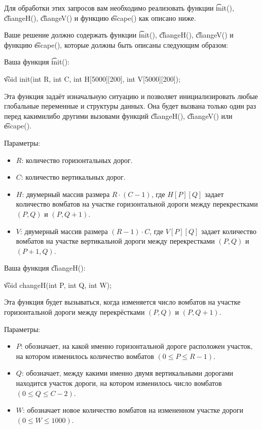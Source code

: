Для обработки этих запросов вам необходимо реализовать функции \t{init()}, \t{changeH()}, \t{changeV()} и функцию \t{escape()} как описано ниже.

Ваше решение должно содержать функции \t{init()}, \t{changeH()}, \t{changeV()} и функцию \t{escape()}, которые должны быть описаны следующим образом:

Ваша функция \t{init()}:

\t{void init(int R, int C, int H[5000][200], int V[5000][200]);}

Эта функция задаёт изначальную ситуацию и позволяет инициализировать любые глобальные переменные и структуры данных. Она будет вызвана только один раз перед какими­либо другими вызовами функций \t{changeH()}, \t{changeV()} или \t{escape()}.

Параметры:
\begin{itemize}
\item $R$: количество горизонтальных дорог.
\item $C$: количество вертикальных дорог.
\item $H$: двумерный массив размера $R \cdot (C - 1)$, где $H[P][Q]$ задает количество вомбатов на участке горизонтальной дороги между перекрестками $(P, Q)$ и $(P, Q + 1)$.
\item $V$: двумерный массив размера $(R - 1) \cdot C$, где $V[P][Q]$ задает количество вомбатов на участке вертикальной дороги между перекрестками $(P, Q)$ и $(P + 1, Q)$.
\end{itemize}


Ваша функция \t{changeH()}:

\t{void changeH(int P, int Q, int W);}

Эта функция будет вызываться, когда изменяется число вомбатов на участке горизонтальной дороги между перекрёстками $(P, Q)$ и $(P, Q + 1)$.

Параметры:

\begin{itemize}
\item $P$: обозначает, на какой именно горизонтальной дороге расположен участок, на котором изменилось количество вомбатов $( 0 \leq P \leq R - 1 )$.
\item $Q$: обозначает, между какими именно двумя вертикальными дорогами находится участок дороги, на котором изменилось число вомбатов $( 0 \leq Q \leq C ­- 2 )$.
\item $W$: обозначает новое количество вомбатов на измененном участке дороги $( 0 \leq W \leq 1 000 )$.
\end{itemize}


